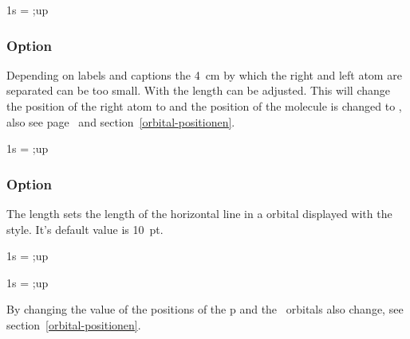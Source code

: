\documentclass[load-preamble+]{cnltx-doc}
\begin{document}
\begin{example}
  \begin{MOdiagram}[style=fancy]
     { 1s = {;up} }
  \end{MOdiagram}
\end{example}

\subsubsection{Option }\label{option:distance}
Depending on labels and captions the \SI{4}{\centi\metre} by which the right
and left atom are separated can be too small. With  the
length can be adjusted. This will change the position of the right atom to
 and the position of the molecule is changed to
, also see page~\pageref{xshift} and
section~\ref{orbital-positionen}.
\begin{example}
  \begin{MOdiagram}[distance=6cm]
     { 1s = {;up} }
  \end{MOdiagram}
\end{example}

\subsubsection{Option }\label{option:AO-width}
The length  sets the length of the horizontal line in a
orbital displayed with the  style. It's default value is
\SI{10}{pt}.
\begin{example}
  \begin{MOdiagram}[AO-width=15pt]
     { 1s = {;up} }
  \end{MOdiagram}
\end{example}

\begin{example}
  \begin{MOdiagram}[style=fancy,AO-width=15pt]
     { 1s = {;up} }
  \end{MOdiagram}
\end{example}
By changing the value of  the positions of the p and the
\chempi\ orbitals also change, see section~\ref{orbital-positionen}.
\end{document}
